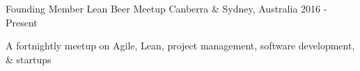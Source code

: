 \begin{cventries}
\vspace{-4.0mm}


\cventry
{Founding Member} %
{Lean Beer Meetup} %
{Canberra \& Sydney, Australia} %
{2016 - Present} %
{ %
\begin{cvitems}
  \item {A fortnightly meetup on Agile, Lean, project management, software development, \& startups}
\end{cvitems}
}


\end{cventries}